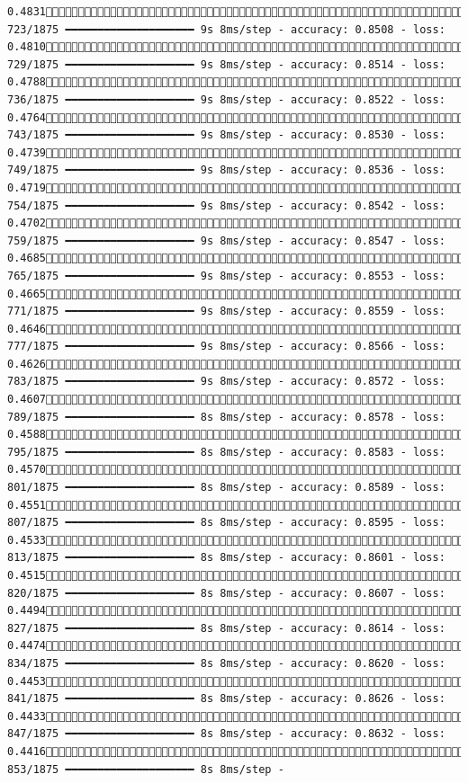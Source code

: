 \documentclass[
  letterpaper,
  DIV=11,
  numbers=noendperiod]{scrreprt}
\begin{document}
\begin{verbatim}
0.4831 723/1875 ━━━━━━━━━━━━━━━━━━━━ 9s 8ms/step - accuracy: 0.8508 - loss: 0.4810 729/1875 ━━━━━━━━━━━━━━━━━━━━ 9s 8ms/step - accuracy: 0.8514 - loss: 0.4788 736/1875 ━━━━━━━━━━━━━━━━━━━━ 9s 8ms/step - accuracy: 0.8522 - loss: 0.4764 743/1875 ━━━━━━━━━━━━━━━━━━━━ 9s 8ms/step - accuracy: 0.8530 - loss: 0.4739 749/1875 ━━━━━━━━━━━━━━━━━━━━ 9s 8ms/step - accuracy: 0.8536 - loss: 0.4719 754/1875 ━━━━━━━━━━━━━━━━━━━━ 9s 8ms/step - accuracy: 0.8542 - loss: 0.4702 759/1875 ━━━━━━━━━━━━━━━━━━━━ 9s 8ms/step - accuracy: 0.8547 - loss: 0.4685 765/1875 ━━━━━━━━━━━━━━━━━━━━ 9s 8ms/step - accuracy: 0.8553 - loss: 0.4665 771/1875 ━━━━━━━━━━━━━━━━━━━━ 9s 8ms/step - accuracy: 0.8559 - loss: 0.4646 777/1875 ━━━━━━━━━━━━━━━━━━━━ 9s 8ms/step - accuracy: 0.8566 - loss: 0.4626 783/1875 ━━━━━━━━━━━━━━━━━━━━ 9s 8ms/step - accuracy: 0.8572 - loss: 0.4607 789/1875 ━━━━━━━━━━━━━━━━━━━━ 8s 8ms/step - accuracy: 0.8578 - loss: 0.4588 795/1875 ━━━━━━━━━━━━━━━━━━━━ 8s 8ms/step - accuracy: 0.8583 - loss: 0.4570 801/1875 ━━━━━━━━━━━━━━━━━━━━ 8s 8ms/step - accuracy: 0.8589 - loss: 0.4551 807/1875 ━━━━━━━━━━━━━━━━━━━━ 8s 8ms/step - accuracy: 0.8595 - loss: 0.4533 813/1875 ━━━━━━━━━━━━━━━━━━━━ 8s 8ms/step - accuracy: 0.8601 - loss: 0.4515 820/1875 ━━━━━━━━━━━━━━━━━━━━ 8s 8ms/step - accuracy: 0.8607 - loss: 0.4494 827/1875 ━━━━━━━━━━━━━━━━━━━━ 8s 8ms/step - accuracy: 0.8614 - loss: 0.4474 834/1875 ━━━━━━━━━━━━━━━━━━━━ 8s 8ms/step - accuracy: 0.8620 - loss: 0.4453 841/1875 ━━━━━━━━━━━━━━━━━━━━ 8s 8ms/step - accuracy: 0.8626 - loss: 0.4433 847/1875 ━━━━━━━━━━━━━━━━━━━━ 8s 8ms/step - accuracy: 0.8632 - loss: 0.4416 853/1875 ━━━━━━━━━━━━━━━━━━━━ 8s 8ms/step - 
\end{verbatim}
\end{document}
